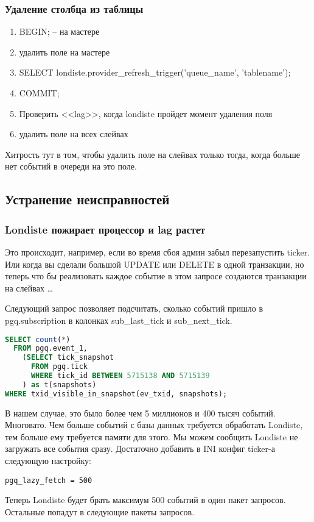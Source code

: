 \subsubsection{Удаление столбца из таблицы}
\begin{enumerate}
 \item BEGIN; -- на мастере
 \item удалить поле на мастере
 \item SELECT londiste.provider\_refresh\_trigger('queue\_name', 'tablename');
 \item COMMIT;
 \item Проверить <<lag>>, когда londiste пройдет момент удаления поля
 \item удалить поле на всех слейвах
\end{enumerate}

Хитрость тут в том, чтобы удалить поле на слейвах только тогда, когда больше нет событий в очереди на это поле.


\subsection{Устранение неисправностей}

\subsubsection{Londiste пожирает процессор и lag растет}
Это происходит, например, если во время сбоя админ забыл перезапустить ticker. Или когда вы сделали большой
UPDATE или DELETE в одной транзакции, но теперь что бы реализовать каждое событие в этом запросе создаются
транзакции на слейвах \dots

Следующий запрос позволяет подсчитать, сколько событий пришло в pgq.subscription в колонках sub\_last\_tick и sub\_next\_tick.
\begin{lstlisting}[language=SQL,label=lst:londiste24,caption=Устранение неисправностей]
SELECT count(*)
  FROM pgq.event_1,
    (SELECT tick_snapshot
      FROM pgq.tick
      WHERE tick_id BETWEEN 5715138 AND 5715139
    ) as t(snapshots)
WHERE txid_visible_in_snapshot(ev_txid, snapshots);
\end{lstlisting}

В нашем случае, это было более чем 5 миллионов и 400 тысяч событий. Многовато. Чем больше событий
с базы данных требуется обработать Londiste, тем больше ему требуется памяти для этого. Мы можем сообщить
Londiste не загружать все события сразу. Достаточно добавить в INI конфиг ticker-а следующую настройку:
\begin{lstlisting}[label=lst:londiste25,caption=Устранение неисправностей]
pgq_lazy_fetch = 500
\end{lstlisting}

Теперь Londiste будет брать максимум 500 событий в один пакет запросов. Остальные попадут в следующие пакеты запросов.